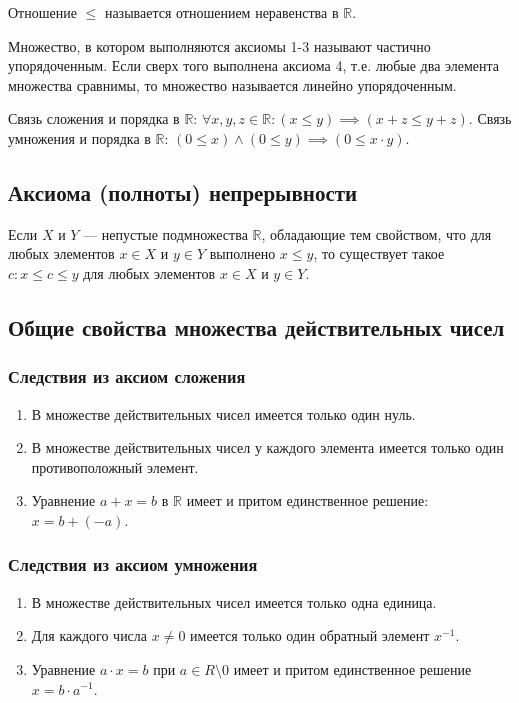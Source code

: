\documentclass[12pt]{report}
\theoremstyle{plain}
\newcommand{\R}{\mathbb R}
\begin{document}
Отношение $\le$ называется отношением неравенства в $\R$.

Множество, в котором выполняются аксиомы 1-3 называют частично упорядоченным.
Если сверх того выполнена аксиома 4, т.е. любые два элемента множества сравнимы, то
множество называется линейно упорядоченным.

Связь сложения и порядка в $\R$: $\forall x, y, z \in \R: (x \le y) \implies (x + z \le y + z)$.
Связь умножения и порядка в $\R$: $(0 \le x) \land (0 \le y) \implies (0 \le x \cdot y)$.

\subsection{Аксиома (полноты) непрерывности}
Если $X$ и $Y$ --- непустые подмножества $\R$, обладающие тем свойством,
что для любых элементов $x \in X$ и $y \in Y$ выполнено $x \le y$,
то существует такое $c: x \le c \le y$ для любых элементов $x \in X$ и $y \in Y$.

\subsection{Общие свойства множества действительных чисел}

\subsubsection{Следствия из аксиом сложения}
\begin{enumerate}
\item В множестве действительных чисел имеется только один нуль.
\item В множестве действительных чисел у каждого элемента имеется
  только один противоположный элемент.
\item Уравнение $a + x = b$ в $\R$ имеет и притом единственное решение:
  $x = b + (-a)$.
\end{enumerate}

\subsubsection{Следствия из аксиом умножения}
\begin{enumerate}
\item В множестве действительных чисел имеется только одна единица.
\item Для каждого числа $x \ne 0$ имеется только один обратный элемент $x^{-1}$.
\item Уравнение $a \cdot x = b$ при $a \in R \setminus 0$ имеет и притом единственное
  решение $x = b \cdot a^{-1}$.
\end{enumerate}
\end{document}

